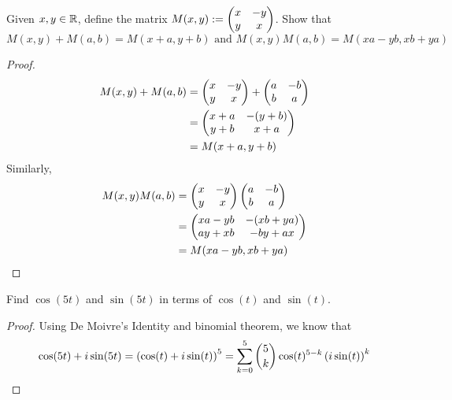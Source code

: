 \documentclass{exam}
\begin{document}
\begin{questions}
    \question Given $x, y\in \mathbb {R}$, define the matrix $M(x, y) := \left( \begin{matrix}
        x & -y \\ y & x
    \end{matrix} \right)$. Show that
    $$M(x, y) + M(a, b) = M(x + a, y + b) \text{ and } M(x, y)M(a, b) = M(xa - yb, xb + ya)$$
    \begin{proof}
        \begin{align*}
            M(x, y) + M(a, b) &= \left( \begin{matrix}
                x & -y \\ y & x
            \end{matrix} \right) + \left( \begin{matrix}
                a & -b \\ b & a
            \end{matrix} \right) \\
            &= \left( \begin{matrix}
                x + a & -(y + b) \\ y + b & x + a
            \end{matrix} \right) \\
            &= M(x + a, y + b)
        \end{align*}
        Similarly,
        \begin{align*}
            M(x, y)M(a, b) &= \left( \begin{matrix}
                x & -y \\ y & x
            \end{matrix} \right)\left( \begin{matrix}
                a & -b \\ b & a
            \end{matrix} \right) \\
            &= \left( \begin{matrix}
                xa - yb & -(xb + ya) \\ ay + xb & -by + ax
            \end{matrix} \right) \\
            &= M(xa - yb, xb + ya)
        \end{align*}
    \end{proof}




    
    \question Find $\cos(5t)$ and $\sin(5t)$ in terms of $\cos(t)$ and $\sin(t)$.
    \begin{proof}
        Using De Moivre's Identity and binomial theorem, we know that $$\cos(5t) + i\sin(5t) = \left( \cos(t) + i\sin(t) \right)^5 = \sum_{k = 0}^5 \binom{5}{k} \cos(t)^{5 - k} \left( i\sin(t) \right)^k$$


\end{proof}
\end{questions}
\end{document}
